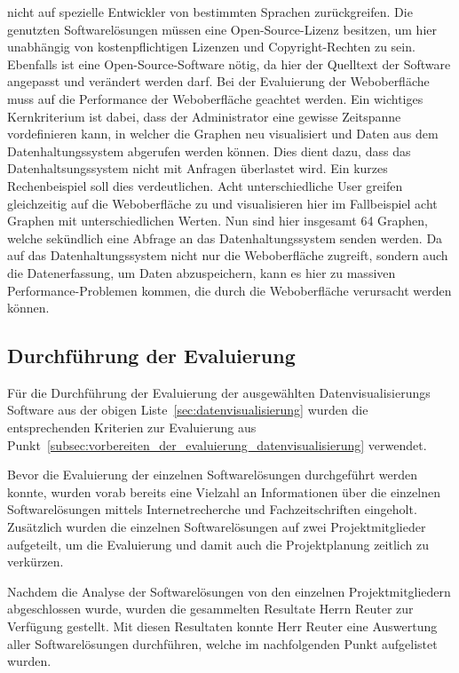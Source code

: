 \begin{outline}
  nicht auf spezielle Entwickler von bestimmten Sprachen zurückgreifen.
  \1 Die genutzten Softwarelösungen müssen eine Open-Source-Lizenz besitzen, um
  hier unabhängig von kostenpflichtigen Lizenzen und Copyright-Rechten zu sein.
  Ebenfalls ist eine Open-Source-Software nötig, da hier der Quelltext der
  Software angepasst und verändert werden darf.
  \1 Bei der Evaluierung der Weboberfläche muss auf die Performance der
  Weboberfläche geachtet werden. Ein wichtiges Kernkriterium ist dabei, dass
  der Administrator eine gewisse Zeitspanne vordefinieren kann, in welcher die
  Graphen neu visualisiert und Daten aus dem Datenhaltungssystem abgerufen
  werden können. Dies dient dazu, dass das Datenhaltsungssystem nicht mit
  Anfragen überlastet wird. Ein kurzes Rechenbeispiel soll dies verdeutlichen.
  Acht unterschiedliche User greifen gleichzeitig auf die Weboberfläche zu und
  visualisieren hier im Fallbeispiel acht Graphen mit unterschiedlichen
  Werten. Nun sind hier insgesamt 64 Graphen, welche sekündlich eine Abfrage an
  das Datenhaltungssystem senden werden. Da auf das Datenhaltungssystem nicht
  nur die Weboberfläche zugreift, sondern auch die Datenerfassung, um Daten
  abzuspeichern, kann es hier zu massiven Performance-Problemen kommen, die
  durch die Weboberfläche verursacht werden können.
\end{outline}
\mr%

\subsection{Durchführung der Evaluierung}
\label{subsec:durchfuehrung_evaluierung_datenvisualisierung}
Für die Durchführung der Evaluierung der ausgewählten Datenvisualisierungs
Software aus der obigen Liste~\ref{sec:datenvisualisierung} wurden die
entsprechenden Kriterien zur Evaluierung aus
Punkt~\ref{subsec:vorbereiten_der_evaluierung_datenvisualisierung} verwendet.


Bevor die Evaluierung der einzelnen Softwarelösungen durchgeführt werden
konnte, wurden vorab bereits eine Vielzahl an Informationen über die einzelnen
Softwarelösungen mittels Internetrecherche und Fachzeitschriften eingeholt.
Zusätzlich wurden die einzelnen Softwarelösungen auf zwei Projektmitglieder
aufgeteilt, um die Evaluierung und damit auch die Projektplanung zeitlich zu
verkürzen.

Nachdem die Analyse der Softwarelösungen von den einzelnen Projektmitgliedern
abgeschlossen wurde, wurden die gesammelten Resultate Herrn Reuter zur
Verfügung gestellt. Mit diesen Resultaten konnte Herr Reuter eine Auswertung
aller Softwarelösungen durchführen, welche im nachfolgenden Punkt aufgelistet
wurden.

